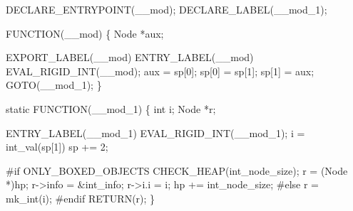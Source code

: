 DECLARE_ENTRYPOINT(__mod);
DECLARE_LABEL(__mod_1);

FUNCTION(__mod)
\{
    Node *aux;

    EXPORT_LABEL(__mod)
 ENTRY_LABEL(__mod)
    EVAL_RIGID_INT(__mod);
    aux   = sp[0];
    sp[0] = sp[1];
    sp[1] = aux;
    GOTO(__mod_1);
\}

static
FUNCTION(__mod_1)
\{
    int  i;
    Node *r;

 ENTRY_LABEL(__mod_1)
    EVAL_RIGID_INT(__mod_1);
    i   = int_val(sp[1]) %
    sp += 2;

#if ONLY_BOXED_OBJECTS
    CHECK_HEAP(int_node_size);
    r       = (Node *)hp;
    r->info = &int_info;
    r->i.i  = i;
    hp     += int_node_size;
#else
    r = mk_int(i);
#endif
    RETURN(r);
\}
\nwendcode{}

%

